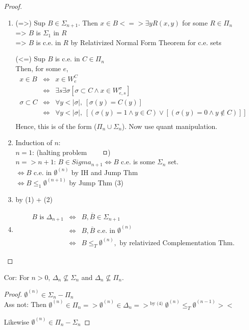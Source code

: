 \documentclass[12pt]{article}
\newcommand{\Conj}[1]{\ensuremath{\overline{#1}}}
\begin{document}
\begin{proof}
\begin{enumerate}[(1)]
 \item  (=>) Sup $B \in \Sigma_{n+1}$.
	Then $ x \in B <=> \exists y R(x,y)$ for some $ R \in \Pi_n$ \\
	=> $B$ is $\Sigma_1$ in $R$ \\
	=> $B$ is c.e. in $R$ by Relativized Normal Form Theorem for c.e. sets

	(<=) Sup $B$ is c.e. in $C \in \Pi_n$ \\
	Then, for some $e$,
	\begin{align*}
	 x \in B &\Leftrightarrow& x \in W^C_e \\
		&\Leftrightarrow& \exists s \exists \sigma 
			[ \sigma \subset C \wedge x \in W^{\sigma}_{e,s} ] \\
	\sigma \subset C &\Leftrightarrow& \forall y < |\sigma|,\ [ \sigma(y) = C(y) ] \\
		&\Leftrightarrow& \forall y < |\sigma|,\ 
			[ (\sigma(y) = 1 \wedge y \in C) \vee [ (\sigma(y) = 0 \wedge y \not\in C) ] ] \\
	\end{align*}
	Hence, this is of the form ($\Pi_n \cup \Sigma_n$). Now use quant manipulation.
 \item Induction of $n$: \\
	$n = 1$: (halting problem $\qed$) \\
	$n => n+1$: $B \in Sigma_{n+1} \Leftrightarrow B$ c.e. is some $\Sigma_n$ set. \\
	$\Leftrightarrow B$ c.e. in $\emptyset^{(n)}$ by IH and Jump Thm \\
	$\Leftrightarrow B \le_1  \emptyset^{(n+1)}$ by Jump Thm (3)
 \item by (1) + (2)
 \item 
\begin{align*}
B \text{ is } \Delta_{n+1}  &\Leftrightarrow& B, \Conj{B} \in \Sigma_{n+1} \\
&\Leftrightarrow& B,\Conj{B} \text{ c.e. in } \emptyset^{(n)} \\
&\Leftrightarrow& B \le_T \emptyset^{(n)}, \text{ by relativized Complementation Thm}.
\end{align*}
\end{enumerate}
\end{proof}

Cor: For $n > 0$, $\Delta_n \not\subseteq \Sigma_n$ and $\Delta_n \not\subseteq \Pi_n$.
\begin{proof}
 $\emptyset^{(n)} \in \Sigma_n - \Pi_n$ \\
	Ass not: Then $\emptyset^{(n)} \in \Pi_n => \emptyset^{(n)} \in \Delta_n 
	=>^{\text{ by (4)}} \emptyset^{(n)} \le_T \emptyset^{(n-1)} ><$

	Likewise $\emptyset^{(n)} \in \Pi_n - \Sigma_n$
\end{proof}
\end{document}

